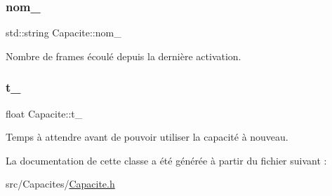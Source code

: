 \subsubsection{\texorpdfstring{nom\+\_\+}{nom\_}}
{\footnotesize\ttfamily std\+::string Capacite\+::nom\+\_\+\hspace{0.3cm}{\ttfamily [protected]}}



Nombre de frames écoulé depuis la dernière activation. 

\mbox{\label{class_capacite_ade805898750e70261be4f4ced92a9063}} 
\subsubsection{\texorpdfstring{t\+\_\+}{t\_}}
{\footnotesize\ttfamily float Capacite\+::t\+\_\+\hspace{0.3cm}{\ttfamily [protected]}}



Temps à attendre avant de pouvoir utiliser la capacité à nouveau. 



La documentation de cette classe a été générée à partir du fichier suivant \+:\begin{DoxyCompactItemize}
\item 
src/\+Capacites/\hyperlink{_capacite_8h}{Capacite.\+h}\end{DoxyCompactItemize}
